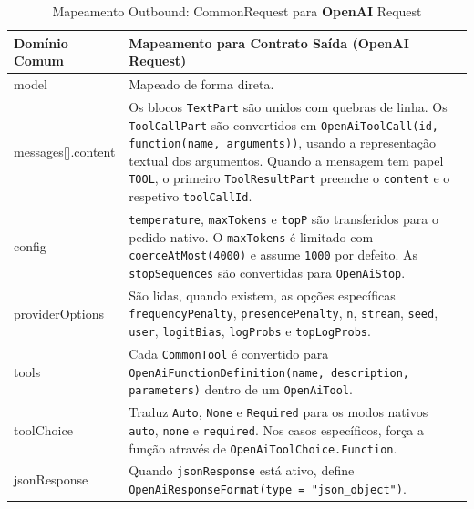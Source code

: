     \begin{table}[H]
        \centering
        \footnotesize
        \renewcommand{\arraystretch}{1.25}
        \begin{tabularx}{\textwidth}{|>{\ttfamily\raggedright\arraybackslash}p{4cm}|Y|}
            \hline
            \textbf{Domínio Comum} & \textbf{Mapeamento para Contrato Saída (OpenAI Request)} \\
            \hline
            model & Mapeado de forma direta. \\
            \hline
            messages[].content & Os blocos \texttt{TextPart} são unidos com quebras de linha. Os \texttt{ToolCallPart} são convertidos em \texttt{OpenAiToolCall(id, function(name, arguments))}, usando a representação textual dos argumentos. Quando a mensagem tem papel \texttt{TOOL}, o primeiro \texttt{ToolResultPart} preenche o \texttt{content} e o respetivo \texttt{toolCallId}. \\
            \hline
            config & \texttt{temperature}, \texttt{maxTokens} e \texttt{topP} são transferidos para o pedido nativo. O \texttt{maxTokens} é limitado com \texttt{coerceAtMost(4000)} e assume \texttt{1000} por defeito. As \texttt{stopSequences} são convertidas para \texttt{OpenAiStop}. \\
            \hline
            providerOptions & São lidas, quando existem, as opções específicas \texttt{frequencyPenalty}, \texttt{presencePenalty}, \texttt{n}, \texttt{stream}, \texttt{seed}, \texttt{user}, \texttt{logitBias}, \texttt{logProbs} e \texttt{topLogProbs}. \\
            \hline
            tools & Cada \texttt{CommonTool} é convertido para \texttt{OpenAiFunctionDefinition(name, description, parameters)} dentro de um \texttt{OpenAiTool}. \\
            \hline
            toolChoice & Traduz \texttt{Auto}, \texttt{None} e \texttt{Required} para os modos nativos \texttt{auto}, \texttt{none} e \texttt{required}. Nos casos específicos, força a função através de \texttt{OpenAiToolChoice.Function}. \\
            \hline
            jsonResponse & Quando \texttt{jsonResponse} está ativo, define \texttt{OpenAiResponseFormat(type = "json\_object")}. \\
            \hline
        \end{tabularx}
        \caption{Mapeamento Outbound: CommonRequest para \textbf{OpenAI} Request}
    \end{table}

